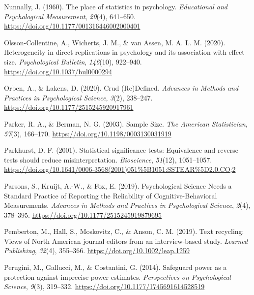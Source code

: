 \documentclass[
  letterpaper,
  DIV=11,
  numbers=noendperiod]{scrreprt}
\newlength{\cslhangindent}
\newlength{\cslentryspacingunit} %
\newenvironment{CSLReferences}[2] %
 {%
  \setlength{\parindent}{0pt}
  \ifodd #1
  \let\oldpar\par
  \def\par{\hangindent=\cslhangindent\oldpar}
  \fi
  \setlength{\parskip}{#2\cslentryspacingunit}
 }%
 {}
\begin{document}
\begin{CSLReferences}{1}{0}
\leavevmode{}%
Nunnally, J. (1960). The place of statistics in psychology.
\emph{Educational and Psychological Measurement}, \emph{20}(4),
641--650. \url{https://doi.org/10.1177/001316446002000401}

\leavevmode{}%
Olsson-Collentine, A., Wicherts, J. M., \& van Assen, M. A. L. M.
(2020). Heterogeneity in direct replications in psychology and its
association with effect size. \emph{Psychological Bulletin},
\emph{146}(10), 922--940. \url{https://doi.org/10.1037/bul0000294}

\leavevmode{}%
Orben, A., \& Lakens, D. (2020). Crud ({Re}){Defined}. \emph{Advances in
Methods and Practices in Psychological Science}, \emph{3}(2), 238--247.
\url{https://doi.org/10.1177/2515245920917961}

\leavevmode{}%
Parker, R. A., \& Berman, N. G. (2003). Sample {Size}. \emph{The
American Statistician}, \emph{57}(3), 166--170.
\url{https://doi.org/10.1198/0003130031919}

\leavevmode{}%
Parkhurst, D. F. (2001). Statistical significance tests: {Equivalence}
and reverse tests should reduce misinterpretation. \emph{Bioscience},
\emph{51}(12), 1051--1057.
\url{https://doi.org/10.1641/0006-3568(2001)051\%5B1051:SSTEAR\%5D2.0.CO;2}

\leavevmode{}%
Parsons, S., Kruijt, A.-W., \& Fox, E. (2019). Psychological {Science
Needs} a {Standard Practice} of {Reporting} the {Reliability} of
{Cognitive-Behavioral Measurements}. \emph{Advances in Methods and
Practices in Psychological Science}, \emph{2}(4), 378--395.
\url{https://doi.org/10.1177/2515245919879695}

\leavevmode{}%
Pemberton, M., Hall, S., Moskovitz, C., \& Anson, C. M. (2019). Text
recycling: {Views} of {North American} journal editors from an
interview-based study. \emph{Learned Publishing}, \emph{32}(4),
355--366. \url{https://doi.org/10.1002/leap.1259}

\leavevmode{}%
Perugini, M., Gallucci, M., \& Costantini, G. (2014). Safeguard power as
a protection against imprecise power estimates. \emph{Perspectives on
Psychological Science}, \emph{9}(3), 319--332.
\url{https://doi.org/10.1177/1745691614528519}


\end{CSLReferences}
\end{document}
